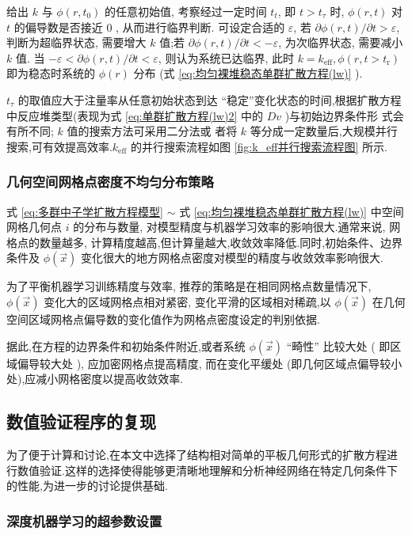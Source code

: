 \documentclass{Sichuan Normal University}
\begin{document}
给出 $k$ 与 $\phi\left(r, t_0\right)$ 的任意初始值, 考察经过一定时间 $t_t$, 即 $t>t_\tau$ 时, $\phi(r, t)$ 对 $t$ 的偏导数是否接近 0 , 从而进行临界判断.
可设定合适的 $\varepsilon$, 若 $\partial \phi(r, t) / \partial t>\varepsilon$, 判断为超临界状态, 需要增大 $k$ 值;若 $\partial \phi(r, t) / \partial t<-\varepsilon$, 为次临界状态, 需要减小 $k$ 值.
当 $-\varepsilon<\partial \phi(r, t) / \partial t<\varepsilon$, 则认为系统已达临界, 此时 $k=k_{\mathrm{eff}}, \phi\left(r, t>t_{\mathrm{r}}\right)$ 即为稳态时系统的 $\phi(r)$ 分布 (式 \eqref{eq:均匀裸堆稳态单群扩散方程(lw)} ).

$t_\tau$ 的取值应大于注量率从任意初始状态到达 “稳定”变化状态的时间,根据扩散方程中反应堆类型(表现为式 \eqref{eq:单群扩散方程(lw)2} 中的 $Dv$ )与初始边界条件形 式会有所不同;
$k$ 值的搜索方法可采用二分法或 者将 $k$ 等分成一定数量后,大规模并行搜索,可有效提高效率.$k_{\text{eff}}$ 的并行搜索流程如图 \ref{fig:k_eff并行搜索流程图} 所示.

\subsubsection{几何空间网格点密度不均匀分布策略}\label{sec:几何空间网格点密度不均匀分布策略}
式 \eqref{eq:多群中子学扩散方程模型}  $\sim$ 式 \eqref{eq:均匀裸堆稳态单群扩散方程(lw)} 中空间网格几何点 $i$ 的分布与数量, 对模型精度与机器学习效率的影响很大.通常来说, 网格点的数量越多, 计算精度越高,但计算量越大,收敛效率降低.同时,初始条件、边界条件及 $\phi(\vec{x})$ 变化很大的地方网格点密度对模型的精度与收敛效率影响很大.

为了平衡机器学习训练精度与效率, 推荐的策略是在相同网格点数量情况下, $\phi(\vec{x})$ 变化大的区域网格点相对紧密, 变化平滑的区域相对稀疏,以 $\phi(\vec{x})$ 在几何空间区域网格点偏导数的变化值作为网格点密度设定的判别依据.

据此,在方程的边界条件和初始条件附近,或者系统 $\phi(\vec{x})$ “畸性” 比较大处 ( 即区域偏导较大处 ), 应加密网格点提高精度, 而在变化平缓处 (即几何区域点偏导较小处),应减小网格密度以提高收敛效率.
\subsection{数值验证程序的复现}

为了便于计算和讨论,在本文中选择了结构相对简单的平板几何形式的扩散方程进行数值验证.这样的选择使得能够更清晰地理解和分析神经网络在特定几何条件下的性能,为进一步的讨论提供基础.

\subsubsection{深度机器学习的超参数设置}
\end{document}
